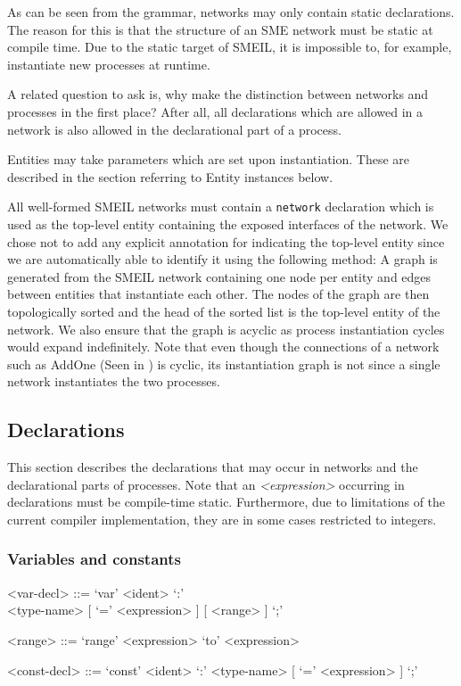 As can be seen from the grammar, networks may only contain static
declarations. The reason for this is that the structure of an SME network must
be static at compile time. Due to the static target of SMEIL, it is impossible
to, for example, instantiate new processes at runtime.

A related question to ask is, why make the distinction between networks and
processes in the first place? After all, all declarations which are allowed in
a network is also allowed in the declarational part of a process. 


Entities may take parameters which are set upon instantiation. These are
described in the section referring to Entity instances below.


All well-formed SMEIL networks must contain a {\tt network} declaration which is
used as the top-level entity containing the exposed interfaces of the
network. We chose not to add any explicit annotation for indicating the
top-level entity since we are automatically able to identify it using the
following method: A graph is generated from the SMEIL network containing one
node per entity and edges between entities that instantiate each other. The
nodes of the graph are then topologically sorted and the head of the sorted list
is the top-level entity of the network. We also ensure that the graph is acyclic
as process instantiation cycles would expand indefinitely. Note that even though
the connections of a network such as AddOne (Seen in ) is
cyclic, its instantiation graph is not since a single network instantiates the
two processes.


\subsection{Declarations}
This section describes the declarations that may occur in {\ttfamily network}s
and the declarational parts of {\ttfamily processe}s. Note that an {\itshape
  <expression>} occurring in declarations must be compile-time
static. Furthermore, due to limitations of the current compiler implementation,
they are in some cases restricted to integers.

\subsubsection{Variables and constants}
\begin{grammar}
  <var-decl> ::= `var' <ident> `:' \\ <type-name> [ `=' <expression> ] [ <range> ] `;'

  <range> ::= `range' <expression> `to' <expression>

  <const-decl> ::= `const' <ident> `:' <type-name> [ `=' <expression> ] `;'
\end{grammar}

